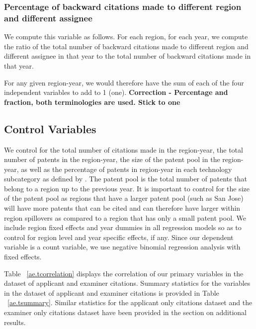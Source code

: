 \documentclass[12pt,letterpaper]{article}
\begin{document}
\subsubsection{Percentage of backward citations made to different region and different assignee}
We compute this variable as follows. For each region, for each year, we compute the ratio of the total number of backward citations made to different region and different assignee in that year to the total number of backward citations made in that year.\par

For any given region-year, we would therefore have the sum of each of the four independent variables to add to 1 (one). \textbf{Correction - Percentage and fraction, both terminologies are used. Stick to one}

\subsection{Control Variables}
We control for the total number of citations made in the region-year, the total number of patents in the region-year, the size of the patent pool in the region-year, as well as the percentage of patents in region-year in each technology subcategory as defined by \cite*{Hall2001a}. The patent pool is the total number of patents that belong to a region up to the previous year. It is important to control for the size of the patent pool as  regions that have a larger patent pool (such as San Jose) will have more patents that can be cited and can therefore have larger within region spillovers as compared to a region that has only a small patent pool. We include region fixed effects and year dummies in all regression models so as to control for region level and year specific effects, if any. Since our dependent variable is a count variable, we use negative binomial regression analysis with fixed effects. \par

Table ~\ref{ae.tcorrelation} displays the correlation of our primary variables in the dataset of applicant and examiner citations. Summary statistics for the variables in the dataset of applicant and examiner citations is provided in Table ~\ref{ae.tsummary}. Similar statistics for the applicant only citations dataset and the examiner only citations dataset have been provided in the section on additional results.



\end{document}

